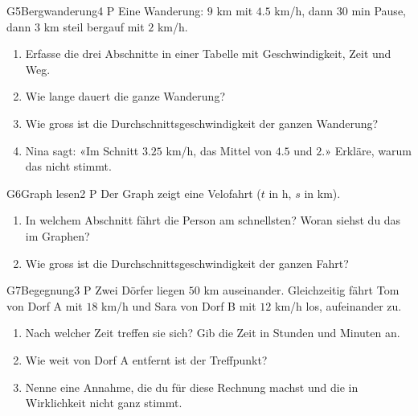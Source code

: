 \documentclass[11pt]{article}
\begin{document}

\begin{lpaufgabe}{G5}{Bergwanderung}{4 P}
Eine Wanderung: $9$ km mit $4.5$ km/h, dann $30$ min Pause, dann $3$ km steil bergauf mit $2$ km/h.
\begin{enumerate}[label=(\alph*),leftmargin=*,itemsep=3pt]
\item Erfasse die drei Abschnitte in einer Tabelle mit Geschwindigkeit, Zeit und Weg.
\item Wie lange dauert die ganze Wanderung?
\item Wie gross ist die Durchschnittsgeschwindigkeit der ganzen Wanderung?
\item Nina sagt: «Im Schnitt $3.25$ km/h, das Mittel von $4.5$ und $2$.» Erkläre, warum das nicht stimmt.
\end{enumerate}
\end{lpaufgabe}

\begin{lpaufgabe}{G6}{Graph lesen}{2 P}
Der Graph zeigt eine Velofahrt ($t$ in h, $s$ in km).
\begin{center}
\end{center}
\begin{enumerate}[label=(\alph*),leftmargin=*,itemsep=3pt]
\item In welchem Abschnitt fährt die Person am schnellsten? Woran siehst du das im Graphen?
\item Wie gross ist die Durchschnittsgeschwindigkeit der ganzen Fahrt?
\end{enumerate}
\end{lpaufgabe}


\begin{lpaufgabe}{G7}{Begegnung}{3 P}
Zwei Dörfer liegen $50$ km auseinander. Gleichzeitig fährt Tom von Dorf A mit $18$ km/h und Sara von Dorf B mit $12$ km/h los, aufeinander zu.
\begin{enumerate}[label=(\alph*),leftmargin=*,itemsep=3pt]
\item Nach welcher Zeit treffen sie sich? Gib die Zeit in Stunden und Minuten an.
\item Wie weit von Dorf A entfernt ist der Treffpunkt?
\item Nenne eine Annahme, die du für diese Rechnung machst und die in Wirklichkeit nicht ganz stimmt.
\end{enumerate}
\end{lpaufgabe}
\end{document}
